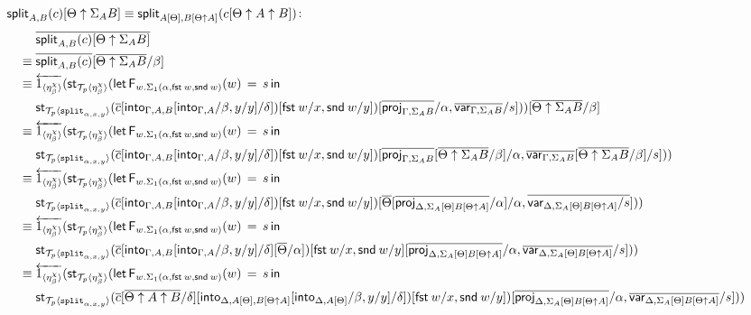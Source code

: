 \documentclass[10pt]{article}
\theoremstyle{definition}
\newcommand\dsd[1]{\ensuremath{\mathsf{#1}}}
\newcommand{\app}[2]{\ensuremath{#1 \: #2}}
\newcommand{\fst}[1]{\app{\dsd{fst}}{#1}}
\newcommand{\snd}[1]{\app{\dsd{snd}}{#1}}
\newcommand{\rewrite}[2]{\overleftarrow{#1}(#2)}
\newcommand\StI[2]{\ensuremath{\mathsf{st}_{#1}(#2)}}
\newcommand\FEs[4]{\ensuremath{\mathsf{let} \, \mathsf{F}_{#1}(#3) \, = \, {#2} \, \mathsf{in} \, #4}}
\newcommand\ApEl[2]{\mathcal{T}_{#1}\langle#2\rangle}
\begin{document}
\begin{enumerate}[style = multiline, labelwidth = 80pt]
\item[{$\mathsf{split}_{A,B}(c)[\Theta \uparrow \Sigma_A B] \equiv \mathsf{split}_{A[\Theta],B[\Theta \uparrow A]}(c[\Theta \uparrow A \uparrow B])$}:]
\begin{align*}
&\upstairs{\qsplit{A,B}(c)[\Theta \uparrow \Sigma_A B]} \\
\equiv{} &\upstairs{\qsplit{A,B}(c)}[\upstairs{\Theta \uparrow \Sigma_A B}/\beta] \\
\equiv{} &\rewrite{1_{\langle \eta^\chi_\beta \rangle}}{\StI{\ApEl{p}{\eta^\chi_\beta}}{\FEs{w. \Sigma_1(\alpha,\fst w, \snd w)}{s}{w}{\\&\StI{\ApEl{p}{\tsplit{\alpha,x,y}}}{\upstairs{c}[\into{\Gamma, A, B}[\into{\Gamma, A}/\beta, y/y] /\delta]}[\fst w/x, \snd w/y]})[\upstairs{\proj{\Gamma, \Sigma_A B}}/\alpha, \upstairs{\var{\Gamma, \Sigma_A B}}/s]}}[\upstairs{\Theta \uparrow \Sigma_A B}/\beta] \\
\equiv{} &\rewrite{1_{\langle \eta^\chi_\beta \rangle}}{\StI{\ApEl{p}{\eta^\chi_\beta}}{\FEs{w. \Sigma_1(\alpha,\fst w, \snd w)}{s}{w}{\\&\StI{\ApEl{p}{\tsplit{\alpha,x,y}}}{\upstairs{c}[\into{\Gamma, A, B}[\into{\Gamma, A}/\beta, y/y] /\delta]}[\fst w/x, \snd w/y]})[\upstairs{\proj{\Gamma, \Sigma_A B}}[\upstairs{\Theta \uparrow \Sigma_A B}/\beta]/\alpha, \upstairs{\var{\Gamma, \Sigma_A B}}[\upstairs{\Theta \uparrow \Sigma_A B}/\beta]/s]}} \\
\equiv{} &\rewrite{1_{\langle \eta^\chi_\beta \rangle}}{\StI{\ApEl{p}{\eta^\chi_\beta}}{\FEs{w. \Sigma_1(\alpha,\fst w, \snd w)}{s}{w}{\\&\StI{\ApEl{p}{\tsplit{\alpha,x,y}}}{\upstairs{c}[\into{\Gamma, A, B}[\into{\Gamma, A}/\beta, y/y] /\delta]}[\fst w/x, \snd w/y]})[\upstairs{\Theta}[\upstairs{\proj{\Delta, \Sigma_A[\Theta] B[\Theta \uparrow A]}}/\alpha]/\alpha, \upstairs{\var{\Delta, \Sigma_A[\Theta] B[\Theta \uparrow A]}/s}]}} \\
\equiv{} &\rewrite{1_{\langle \eta^\chi_\beta \rangle}}{\StI{\ApEl{p}{\eta^\chi_\beta}}{\FEs{w. \Sigma_1(\alpha,\fst w, \snd w)}{s}{w}{\\&\StI{\ApEl{p}{\tsplit{\alpha,x,y}}}{\upstairs{c}[\into{\Gamma, A, B}[\into{\Gamma, A}/\beta, y/y] /\delta][\upstairs{\Theta}/\alpha]}[\fst w/x, \snd w/y]}[\upstairs{\proj{\Delta, \Sigma_A[\Theta] B[\Theta \uparrow A]}}/\alpha, \upstairs{\var{\Delta, \Sigma_A[\Theta] B[\Theta \uparrow A]}}/s]}} \\
\equiv{} &\rewrite{1_{\langle \eta^\chi_\beta \rangle}}{\StI{\ApEl{p}{\eta^\chi_\beta}}{\FEs{w. \Sigma_1(\alpha,\fst w, \snd w)}{s}{w}{\\&\StI{\ApEl{p}{\tsplit{\alpha,x,y}}}{\upstairs{c}[\upstairs{\Theta \uparrow A \uparrow B}/\delta][\into{\Delta, A[\Theta], B[\Theta \uparrow A]}[\into{\Delta, A[\Theta]}/\beta, y/y] /\delta]}[\fst w/x, \snd w/y]})[\upstairs{\proj{\Delta, \Sigma_A[\Theta] B[\Theta \uparrow A]}}/\alpha, \upstairs{\var{\Delta, \Sigma_A[\Theta] B[\Theta \uparrow A]}}/s]}} \\

\end{align*}
\end{enumerate}
\end{document}
